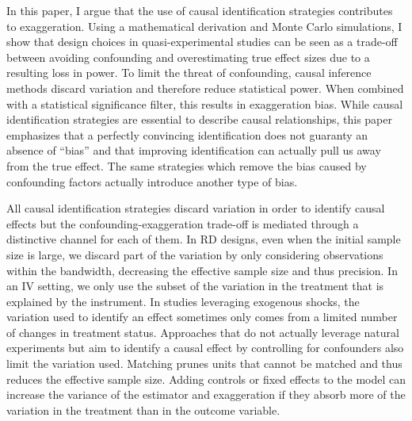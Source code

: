 			In this paper, I argue that the use of causal identification strategies contributes to exaggeration. %
			Using a mathematical derivation and Monte Carlo simulations, I show that design choices in quasi-experimental studies can be seen as a trade-off between avoiding confounding and overestimating true effect sizes due to a resulting loss in power. To limit the threat of confounding, causal inference methods discard variation and therefore reduce statistical power. When combined with a statistical significance filter, this results in exaggeration bias. While causal identification strategies are essential to describe causal relationships, this paper emphasizes that a perfectly convincing identification does not guaranty an absence of ``bias'' and that improving identification can actually pull us away from the true effect. The same strategies which remove the bias caused by confounding factors actually introduce another type of bias.
			
			
			All causal identification strategies discard variation in order to identify causal effects but the confounding-exaggeration trade-off is mediated through a distinctive channel for each of them. In RD designs, even when the initial sample size is large, we discard part of the variation by only considering observations within the bandwidth, decreasing the effective sample size and thus precision. In an IV setting, we only use the subset of the variation in the treatment that is explained by the instrument. In studies leveraging exogenous shocks, the variation used to identify an effect sometimes only comes from a limited number of changes in treatment status. Approaches that do not actually leverage natural experiments but aim to identify a causal effect by controlling for confounders also limit the variation used. 
			Matching prunes units that cannot be matched and thus reduces the effective sample size. Adding controls or fixed effects to the model can increase the variance of the estimator and exaggeration if they absorb more of the variation in the treatment than in the outcome variable. 
			

